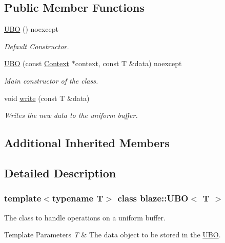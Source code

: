 \subsection*{Public Member Functions}
\begin{DoxyCompactItemize}
\item 
\mbox{\label{classblaze_1_1UBO_a23097bbba43a080b7ea2b99781896e6a}} 
\hyperlink{classblaze_1_1UBO_a23097bbba43a080b7ea2b99781896e6a}{U\+BO} () noexcept
\begin{DoxyCompactList}\small\item\em Default Constructor. \end{DoxyCompactList}\item 
\hyperlink{classblaze_1_1UBO_a3df93d52c42c21080258f142862490bd}{U\+BO} (const \hyperlink{classblaze_1_1Context}{Context} $\ast$context, const T \&data) noexcept
\begin{DoxyCompactList}\small\item\em Main constructor of the class. \end{DoxyCompactList}\item 
void \hyperlink{classblaze_1_1UBO_a67e905adc995d3f0a8ec47208992674d}{write} (const T \&data)
\begin{DoxyCompactList}\small\item\em Writes the new data to the uniform buffer. \end{DoxyCompactList}\end{DoxyCompactItemize}
\subsection*{Additional Inherited Members}


\subsection{Detailed Description}
\subsubsection*{template$<$typename T$>$\newline
class blaze\+::\+U\+B\+O$<$ T $>$}

The class to handle operations on a uniform buffer. 


\begin{DoxyTemplParams}{Template Parameters}
{\em T} & The data object to be stored in the \hyperlink{classblaze_1_1UBO}{U\+BO}. \\
\hline
\end{DoxyTemplParams}


